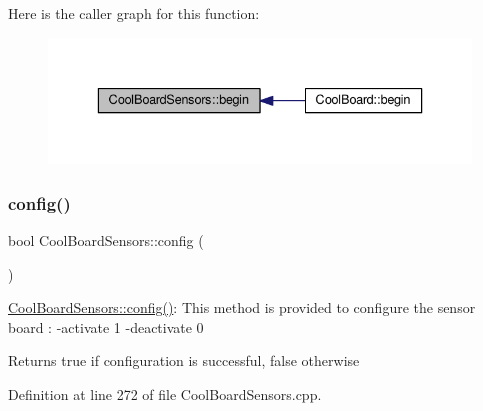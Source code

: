 Here is the caller graph for this function\+:\nopagebreak
\begin{figure}[H]
\begin{center}
\leavevmode
\includegraphics[width=336pt]{de/d46/class_cool_board_sensors_a97095823ef7c8f5290812f1405b966b3_icgraph}
\end{center}
\end{figure}
\mbox{\label{class_cool_board_sensors_a9a218895c5423375c33c08f2c56fb23a}} 
\subsubsection{\texorpdfstring{config()}{config()}}
{\footnotesize\ttfamily bool Cool\+Board\+Sensors\+::config (\begin{DoxyParamCaption}{ }\end{DoxyParamCaption})}

\hyperlink{class_cool_board_sensors_a9a218895c5423375c33c08f2c56fb23a}{Cool\+Board\+Sensors\+::config()}\+: This method is provided to configure the sensor board \+: -\/activate 1 -\/deactivate 0

\begin{DoxyReturn}{Returns}
true if configuration is successful, false otherwise 
\end{DoxyReturn}


Definition at line 272 of file Cool\+Board\+Sensors.\+cpp.


